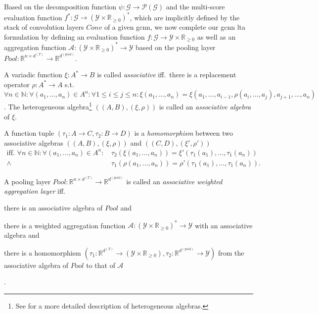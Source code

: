 Based on the decomposition function $\psi: \mathcal{G} \to \mathcal{P}(\mathcal{G})$ and the multi-score evaluation function $f^{*}: \mathcal{G} \to {(\mathcal{Y} \times \mathbb{R}_{\geq 0})}^{*}$, which are implicitly defined by the stack of convolution layers $\mathit{Conv}$ of a given \ac{gcnn}, we now complete our \ac{gcnn} \ac{lta} formulation by defining an evaluation function $f: \mathcal{G} \to \mathcal{Y} \times \mathbb{R}_{\geq 0}$ as well as an aggregation function $\mathcal{A}: {(\mathcal{Y} \times \mathbb{R}_{\geq 0})}^{*} \to \mathcal{Y}$ based on the pooling layer $\mathit{Pool}: \mathbb{R}^{n \times d^{(T)}} \to \mathbb{R}^{d^{(\mathrm{pool})}}$.
\begin{defn}\label{defn:ltag:assoc-algebra}
	A variadic function $\xi: A^{*} \to B$ is called \textit{associative} iff.\ there is a replacement operator $\rho: A^{*} \to A$ s.t.\ $\forall n \in \mathbb{N}: \forall (a_1, \dots, a_n) \in A^n: \forall {1 \leq i \leq j \leq n}: \xi(a_1, \dots, a_n) = \xi(a_1, \dots, a_{i-1}, \rho(a_i, \dots, a_j), a_{j+1}, \dots, a_n)$.
	The heterogeneous algebra\footnote{
		See \citet{Birkhoff1970} for a more detailed description of heterogeneous algebras.
	} $((A, B), (\xi, \rho))$ is called an \textit{associative algebra} of $\xi$.
\end{defn}
\begin{defn}\label{defn:ltag:assoc-algebra-homomorphism}
	A function tuple $(\tau_1: A \to C, \tau_2: B \to D)$ is a \textit{homomorphism} between two associative algebras $((A, B), (\xi, \rho))$ and $((C, D), (\xi', \rho'))$
	\begin{align*}
		\text{iff.\ }
		\forall n \in \mathbb{N}: \forall (a_1, \dots, a_n) \in A^n:
		\, &\tau_2(\xi(a_1, \dots, a_n)) = \xi'(\tau_1(a_1), \dots, \tau_1(a_n)) \\
		\land\, &\tau_1(\rho(a_1, \dots, a_n)) = \rho'(\tau_1(a_1), \dots, \tau_1(a_n)) %
		\text{.}
	\end{align*}
\end{defn}
\begin{defn}\label{defn:ltag:assoc-aggregation-pooling}
	A pooling layer $\mathit{Pool}: \mathbb{R}^{n \times d^{(T)}} \to \mathbb{R}^{d^{(\mathrm{pool})}}$ is called an \textit{associative weighted aggregation layer} iff.
	\begin{enumerate*}[label={\circled{\small\arabic*}}]
		\item there is an associative algebra of $\mathit{Pool}$ and
		\item there is a weighted aggregation function $\mathcal{A}: {(\mathcal{Y} \times \mathbb{R}_{\geq 0})}^{*} \to \mathcal{Y}$ with an associative algebra and
		\item there is a homomorphism $(\tau_{1}: \mathbb{R}^{d^{(T)}} \to (\mathcal{Y} \times \mathbb{R}_{\geq 0}), \tau_{2}: \mathbb{R}^{d^{(\mathrm{pool})}} \to \mathcal{Y})$ from the associative algebra of $\mathit{Pool}$ to that of $\mathcal{A}$
	\end{enumerate*}.
\end{defn}
